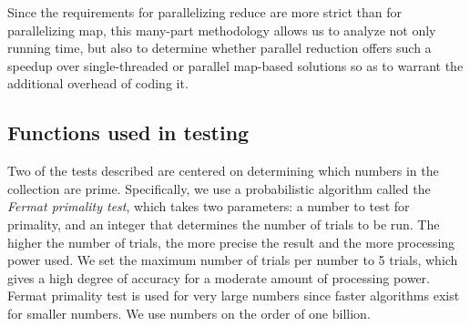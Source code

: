 \documentclass[12pt]{article}
\newcommand{\comment}[1]{{\bf \tt  {#1}}}
\newcommand{\emcomment}[1]{\textcolor{ForestGreen}{\comment{Elena: {#1}}}}
\newcommand{\joecomment}[1]{\textcolor{JoesGold}{\comment{Joe: {#1}}}}
\newcommand{\todo}[1]{\textcolor{blue}{\comment{To Do: {#1}}}}
\begin{document}

Since the requirements for parallelizing reduce are more strict than for parallelizing map, this many-part methodology allows us to analyze not only running time, but also to determine whether parallel reduction offers such a speedup over single-threaded or parallel map-based solutions so as to warrant the additional overhead of coding it. 


\subsection{Functions used in testing}\label{sec:fermat}
Two of the tests described are centered on determining which numbers in the collection are prime. Specifically, we use a probabilistic algorithm called the \emph{Fermat primality test}, which takes two parameters: a number to test for primality, and an integer that determines the number of trials to be run. The higher the number of trials, the more precise the result and the more processing power used. We set the maximum number of trials per number to 5 trials, which gives a high degree of accuracy for a moderate amount of processing power. Fermat primality test is used for very large numbers since faster algorithms exist for smaller numbers. We use numbers on the order of one billion.
\end{document}

